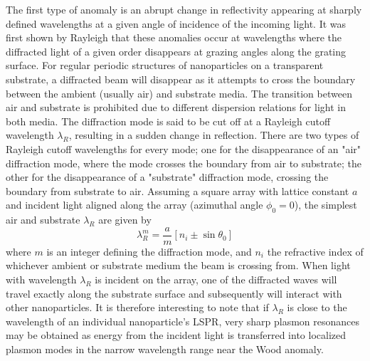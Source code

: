 The first type of anomaly is an abrupt change in reflectivity appearing at sharply defined wavelengths at a given angle of incidence of the incoming light. It was first shown by Rayleigh that these anomalies occur at wavelengths where the diffracted light of a given order disappears at grazing angles along the grating surface\cite{Rayleigh_onWood1907}\cite{Rayleigh_onGratings1907}. For regular periodic structures of nanoparticles on a transparent substrate, a diffracted beam will disappear as it attempts to cross the boundary between the ambient (usually air) and substrate media. The transition between air and substrate is prohibited due to different dispersion relations for light in both media. The diffraction mode is said to be cut off at a Rayleigh cutoff wavelength $\lambda_R$, resulting in a sudden change in reflection. There are two types of Rayleigh cutoff wavelengths for every mode; one for the disappearance of an "air" diffraction mode, where the mode crosses the boundary from air to substrate; the other for the disappearance of a "substrate" diffraction mode, crossing the boundary from substrate to air. Assuming a square array with lattice constant $a$ and incident light aligned along the array (azimuthal angle $\phi_0=0$), the simplest air and substrate $\lambda_R$ are given by %
\begin{equation}
    \lambda_R^m = \frac{a}{m}[n_i \pm \sin\theta_0]
\end{equation}
where $m$ is an integer defining the diffraction mode, and $n_i$ the refractive index of whichever ambient or substrate medium the beam is crossing from. When light with wavelength $\lambda_R$ is incident on the array, one of the diffracted waves will travel exactly along the substrate surface and subsequently will interact with other nanoparticles. It is therefore interesting to note that if $\lambda_R$ is close to the wavelength of an individual nanoparticle's LSPR, very sharp plasmon resonances may be obtained as energy from the incident light is transferred into localized plasmon modes in the narrow wavelength range near the Wood anomaly\cite{narrowLSPRfromDiffractionCoupling}.


